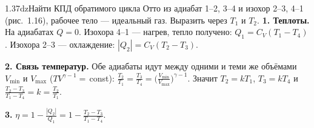\begin{problem}{1.37}{dz}{Найти КПД обратимого цикла Отто из адиабат 1--2, 3--4 и изохор 2--3, 4--1 (рис.~1.16), рабочее тело — идеальный газ. Выразить через $T_1$ и $T_2$.}
\textbf{1. Теплоты.} На адиабатах $Q=0$. Изохора 4--1 — нагрев, тепло получено: $Q_1=C_V(T_1-T_4)$. Изохора 2--3 — охлаждение: $|Q_2|=C_V(T_2-T_3)$.

\textbf{2. Связь температур.} Обе адиабаты идут между одними и теми же объёмами $V_{\min}$ и $V_{\max}$ ($TV^{\gamma-1}=$\,const):
$\frac{T_2}{T_1}=\frac{T_3}{T_4}=\big(\frac{V_{\min}}{V_{\max}}\big)^{\gamma-1}$. Значит $T_2=kT_1$, $T_3=kT_4$ и $\frac{T_2-T_3}{T_1-T_4}=k=\frac{T_2}{T_1}$.

\textbf{3.} $\eta=1-\frac{|Q_2|}{Q_1}=1-\frac{T_2-T_3}{T_1-T_4}$.
\end{problem}
